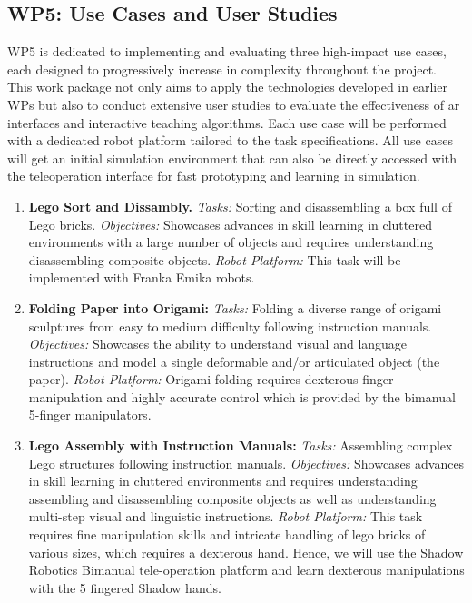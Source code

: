 \documentclass{erc-B2}
\begin{document}
\subsection{WP5: Use Cases and User Studies}
{WP5} is dedicated to implementing and evaluating three high-impact use cases, each designed to progressively increase in complexity throughout the project. This work package not only aims to apply the technologies developed in earlier WPs but also to conduct extensive user studies to evaluate the effectiveness of \gls*{ar} interfaces and interactive teaching algorithms. Each use case will be performed with a dedicated robot platform tailored to the task specifications. All use cases will get an initial simulation environment that can also be directly accessed with the teleoperation interface for fast prototyping and learning in simulation. 
\begin{enumerate}
    \item \textbf{Lego Sort and  Dissambly.} 
    \textit{Tasks:} Sorting and disassembling a box full of Lego bricks.
    \textit{Objectives:} Showcases advances in skill learning in cluttered environments with a large number of objects and requires understanding disassembling composite objects.
    \textit{Robot Platform:} This task will be implemented with Franka Emika robots. 

    \item \textbf{Folding Paper into Origami:}
        \textit{Tasks:} Folding a diverse range of origami sculptures from easy to medium difficulty following instruction manuals.
        \textit{Objectives:} Showcases the ability to understand visual and language instructions and model a single deformable and/or articulated object (the paper).
        \textit{Robot Platform:} Origami folding requires dexterous finger manipulation and highly accurate control which is provided by the bimanual 5-finger manipulators. %
        

    \item \textbf{Lego Assembly with Instruction Manuals:}
         \textit{Tasks:} Assembling complex Lego structures following instruction manuals.
         \textit{Objectives:} Showcases advances in skill learning in cluttered environments and requires understanding assembling and disassembling composite objects as well as understanding multi-step visual and linguistic instructions.
         \textit{Robot Platform:} This task requires fine manipulation skills and intricate handling of lego bricks of various sizes, which requires a dexterous hand. Hence, we will use the Shadow Robotics Bimanual tele-operation platform and learn dexterous manipulations with the 5 fingered Shadow hands. 
\end{enumerate}
\end{document}
